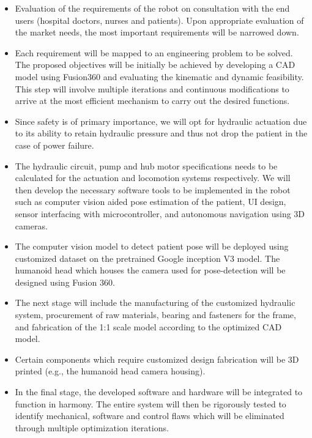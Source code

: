 \documentclass[12]{article}
\begin{document}
	\begin{itemize}
	
		\item Evaluation of the requirements of the robot on consultation with the end users (hospital doctors, nurses and patients). Upon appropriate evaluation of the market needs, the most important requirements will be narrowed down.
		
		\item Each requirement will be mapped to an engineering problem to be solved. The proposed objectives will be initially be achieved by developing a CAD model using Fusion360 and evaluating the kinematic and dynamic feasibility. This step will involve multiple iterations and continuous modifications to arrive at the most efficient mechanism to carry out the desired functions. 
		
		\item Since safety is of primary importance, we will opt for hydraulic actuation due to its ability to retain hydraulic pressure and thus not drop the patient in the case of power failure. 
		
		\item The hydraulic circuit, pump and hub motor specifications needs to be calculated for the actuation and locomotion systems respectively. We will then develop the necessary software tools to be implemented in the robot such as computer vision aided pose estimation of the patient, UI design, sensor interfacing with microcontroller, and autonomous navigation using 3D cameras.  
		
		\item The computer vision model to detect patient pose will be deployed using customized dataset on the pretrained Google inception V3 model. The humanoid head which houses the camera used for pose-detection will be designed using Fusion 360. 
		
		\item The next stage will include the manufacturing of the customized hydraulic system, procurement of raw materials, bearing and fasteners for the frame, and fabrication of the 1:1 scale model according to the optimized CAD model. 
		
		\item Certain components which require customized design fabrication will be 3D printed (e.g., the humanoid head camera housing). 
		
		\item In the final stage, the developed software and hardware will be integrated to function in harmony. The entire system will then be rigorously tested to identify mechanical, software and control flaws which will be eliminated through multiple optimization iterations.  
		
	
	\end{itemize}
\end{document}
